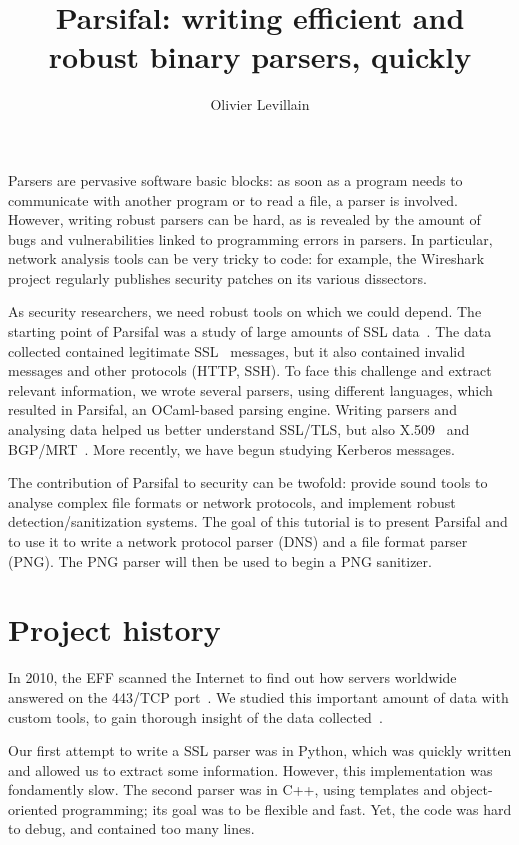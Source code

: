 \documentclass{article}
\title{Parsifal: writing efficient and robust binary parsers, quickly}
\author{Olivier Levillain}
\begin{document}
\maketitle

Parsers are pervasive software basic blocks: as soon as a program
needs to communicate with another program or to read a file, a parser
is involved. However, writing robust parsers can be hard, as is
revealed by the amount of bugs and vulnerabilities linked to
programming errors in parsers.  In particular, network analysis tools
can be very tricky to code: for example, the Wireshark project
regularly publishes security patches on its various dissectors.

As security researchers, we need robust tools on which we could
depend. The starting point of Parsifal was a study of large amounts of
SSL data~\cite{acsac2012}. The data collected contained legitimate
SSL~\cite{rfc5246} messages, but it also contained invalid messages
and other protocols (HTTP, SSH). To face this challenge and extract
relevant information, we wrote several parsers, using different
languages, which resulted in Parsifal, an OCaml-based parsing
engine. Writing parsers and analysing data helped us better understand
SSL/TLS, but also X.509~\cite{rfc5280} and
BGP/MRT~\cite{rfc4271,rfc6396}. More recently, we have begun studying
Kerberos messages.

The contribution of Parsifal to security can be twofold: provide sound
tools to analyse complex file formats or network protocols, and
implement robust detection/sanitization systems.  The goal of this
tutorial is to present Parsifal and to use it to write a network
protocol parser (DNS) and a file format parser (PNG). The PNG parser
will then be used to begin a PNG sanitizer.



\section{Project history}

In 2010, the EFF scanned the Internet to find out how servers
worldwide answered on the 443/TCP port~\cite{eff-observatory,
  eckersley-obs1, eckersley-obs2}. We studied this important amount of
data with custom tools, to gain thorough insight of the data
collected~\cite{acsac2012}.

Our first attempt to write a SSL parser was in Python, which was
quickly written and allowed us to extract some information. However,
this implementation was fondamently slow. The second parser was in
C++, using templates and object-oriented programming; its goal was to
be flexible and fast. Yet, the code was hard to debug, and contained
too many lines.
\end{document}
